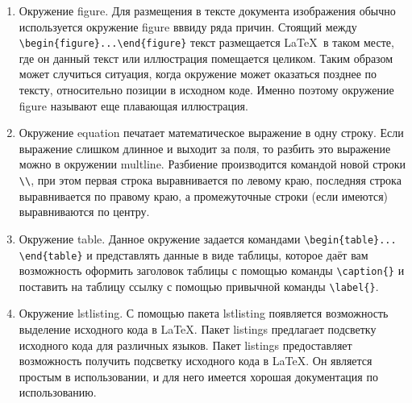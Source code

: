     \begin{enumerate}
        \item Окружение figure. Для размещения в тексте документа изображения обычно используется окружение figure вввиду ряда причин. Стоящий между \verb|\begin{figure}...\end{figure}| текст  размещается \LaTeX\verb| |в таком месте, где он данный текст или иллюстрация помещается целиком. Таким образом может случиться ситуация, когда окружение может оказаться позднее по тексту, относительно позиции в исходном коде. Именно поэтому окружение figure называют еще \guillemotleft плавающая иллюстрация\guillemotright.

        \item Окружение equation печатает математическое выражение в одну строку. Если выражение слишком длинное и выходит за поля, то разбить это выражение можно в окружении multline. Разбиение производится командой новой строки \verb|\\|, при этом первая строка выравнивается по левому краю, последняя строка выравнивается по правому краю, а промежуточные строки (если имеются) выравниваются по центру.

        \item Окружение table. Данное окружение задается командами \verb|\begin{table}... \end{table}| и представлять данные в виде таблицы, которое даёт вам возможность оформить заголовок таблицы с помощью команды \verb|\caption{}| и поставить на таблицу ссылку с помощью привычной команды \verb|\label{}|.

        \item Окружение lstlisting. С помощью пакета lstlisting появляется возможность выделение исходного кода в \LaTeX. Пакет listings предлагает подсветку исходного кода для различных языков. Пакет listings предоставляет возможность получить подсветку исходного кода в \LaTeX. Он является простым в использовании, и для него имеется хорошая документация по использованию.
        
    \end{enumerate}
